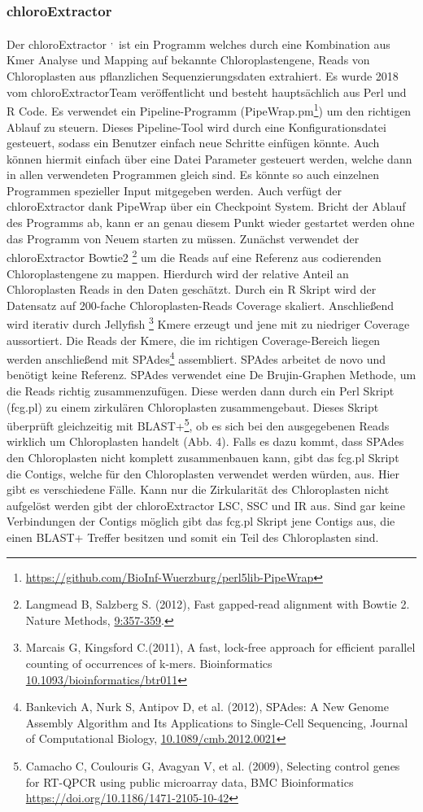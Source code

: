 \documentclass{scrartcl}
\begin{document}
\subsubsection{chloroExtractor}
\label{sec-2-5-1}
Der chloroExtractor \footnotemark[16]{}\textsuperscript{,}\,\footnotemark[17]{} ist ein Programm welches durch eine Kombination aus Kmer Analyse und Mapping auf bekannte Chloroplastengene, Reads von Chloroplasten aus pflanzlichen Sequenzierungsdaten
extrahiert. Es wurde 2018 vom chloroExtractorTeam veröffentlicht \footnotemark[16]{} und besteht hauptsächlich aus Perl und R Code. Es verwendet ein Pipeline-Programm (PipeWrap.pm\footnote{\url{https://github.com/BioInf-Wuerzburg/perl5lib-PipeWrap}}) um den richtigen Ablauf zu steuern.
Dieses Pipeline-Tool wird durch eine Konfigurationsdatei gesteuert, sodass ein Benutzer einfach neue Schritte einfügen könnte. Auch können hiermit einfach über eine Datei Parameter gesteuert werden, welche dann in 
allen verwendeten Programmen gleich sind. Es könnte so auch einzelnen Programmen spezieller Input mitgegeben werden. Auch verfügt der chloroExtractor dank PipeWrap über ein Checkpoint System. Bricht der Ablauf des Programms
ab, kann er an genau diesem Punkt wieder gestartet werden ohne das Programm von Neuem starten zu müssen. Zunächst verwendet der chloroExtractor Bowtie2 \footnote{Langmead B, Salzberg S. (2012), Fast gapped-read alignment with Bowtie 2. Nature Methods, \url{9:357-359}.} um die Reads auf eine Referenz aus codierenden Chloroplastengene zu mappen.
Hierdurch wird der relative Anteil an Chloroplasten Reads in den Daten geschätzt. Durch ein R Skript wird der Datensatz auf 200-fache Chloroplasten-Reads Coverage skaliert. Anschließend wird iterativ durch Jellyfish \footnote{Marcais G, Kingsford C.(2011), A fast, lock-free approach for efficient parallel counting of occurrences of k-mers. Bioinformatics  \url{10.1093/bioinformatics/btr011}} Kmere erzeugt und jene mit
zu niedriger Coverage aussortiert. Die Reads der Kmere, die im richtigen Coverage-Bereich liegen werden anschließend mit SPAdes\footnote{Bankevich A, Nurk S, Antipov D, et al. (2012), SPAdes: A New Genome Assembly Algorithm and Its Applications to Single-Cell Sequencing, Journal of Computational Biology, \url{10.1089/cmb.2012.0021}} assembliert. SPAdes arbeitet de novo und benötigt
keine Referenz. SPAdes verwendet eine De Brujin-Graphen Methode, um die Reads richtig zusammenzufügen. Diese werden dann durch ein Perl Skript (fcg.pl) zu einem zirkulären Chloroplasten zusammengebaut. Dieses Skript überprüft
gleichzeitig mit BLAST+\footnote{Camacho C, Coulouris G, Avagyan V, et al. (2009), Selecting control genes for RT-QPCR using public microarray data, BMC Bioinformatics \url{https://doi.org/10.1186/1471-2105-10-42}}, ob es sich bei den ausgegebenen Reads wirklich um Chloroplasten handelt (Abb. 4). Falls es dazu kommt,
dass SPAdes den Chloroplasten nicht komplett zusammenbauen kann, gibt das fcg.pl Skript die Contigs, welche für den Chloroplasten verwendet werden würden, aus. Hier gibt es verschiedene Fälle. Kann nur die Zirkularität 
des Chloroplasten nicht aufgelöst werden gibt der chloroExtractor LSC, SSC und IR aus. Sind gar keine Verbindungen der Contigs möglich gibt das fcg.pl Skript jene Contigs aus, die einen BLAST+ Treffer besitzen und somit ein
Teil des Chloroplasten sind.
\end{document}
